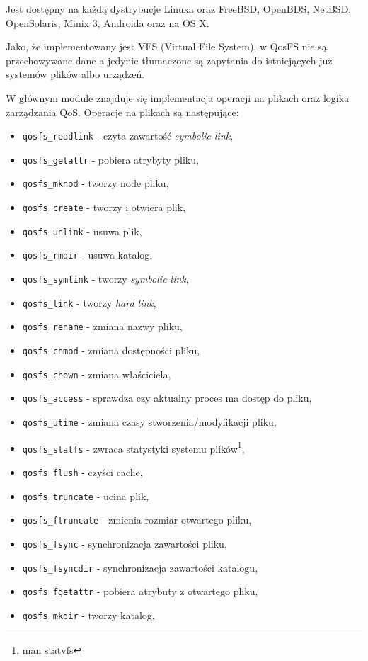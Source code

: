 Jest dostępny na każdą dystrybucje Linuxa oraz FreeBSD, OpenBDS, NetBSD, OpenSolaris, Minix 3, Androida oraz na OS X.

Jako, że implementowany jest VFS (Virtual File System),
w QosFS nie są przechowywane dane a jedynie tłumaczone są zapytania do istniejących już systemów plików albo urządzeń.

W głównym module znajduje się implementacja operacji na plikach oraz
logika zarządzania QoS. Operacje na plikach są następujące:
\begin{itemize}
\item \texttt{qosfs\_readlink} -  czyta zawartość \emph{symbolic link},
\item \texttt{qosfs\_getattr} - pobiera atrybyty pliku,
\item \texttt{qosfs\_mknod} - tworzy node pliku,
\item \texttt{qosfs\_create} - tworzy i otwiera plik,
\item \texttt{qosfs\_unlink} - usuwa plik,
\item \texttt{qosfs\_rmdir} - usuwa katalog,
\item \texttt{qosfs\_symlink} - tworzy \emph{symbolic link},
\item \texttt{qosfs\_link} - tworzy \emph{hard link},
\item \texttt{qosfs\_rename} - zmiana nazwy pliku,
\item \texttt{qosfs\_chmod} - zmiana dostępności pliku,
\item \texttt{qosfs\_chown} - zmiana właściciela,
\item \texttt{qosfs\_access} - sprawdza czy aktualny proces ma dostęp do pliku,
\item \texttt{qosfs\_utime} - zmiana czasy stworzenia/modyfikacji pliku,
\item \texttt{qosfs\_statfs} - zwraca statystyki systemu plików\footnote{man statvfs},
\item \texttt{qosfs\_flush} - czyści cache,
\item \texttt{qosfs\_truncate} - ucina plik,
\item \texttt{qosfs\_ftruncate} - zmienia rozmiar otwartego pliku,
\item \texttt{qosfs\_fsync} - synchronizacja zawartości pliku,
\item \texttt{qosfs\_fsyncdir} - synchronizacja zawartości katalogu,
\item \texttt{qosfs\_fgetattr} - pobiera atrybuty z otwartego pliku,
\item \texttt{qosfs\_mkdir} - tworzy katalog,

\end{itemize}
